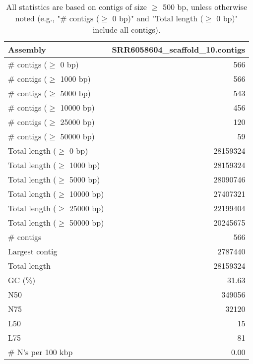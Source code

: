 \documentclass[12pt,a4paper]{article}
\begin{document}
\begin{table}[ht]
\begin{center}
\caption{All statistics are based on contigs of size $\geq$ 500 bp, unless otherwise noted (e.g., "\# contigs ($\geq$ 0 bp)" and "Total length ($\geq$ 0 bp)" include all contigs).}
\begin{tabular}{|l*{1}{|r}|}
\hline
Assembly & SRR6058604\_scaffold\_10.contigs \\ \hline
\# contigs ($\geq$ 0 bp) & 566 \\ \hline
\# contigs ($\geq$ 1000 bp) & 566 \\ \hline
\# contigs ($\geq$ 5000 bp) & 543 \\ \hline
\# contigs ($\geq$ 10000 bp) & 456 \\ \hline
\# contigs ($\geq$ 25000 bp) & 120 \\ \hline
\# contigs ($\geq$ 50000 bp) & 59 \\ \hline
Total length ($\geq$ 0 bp) & 28159324 \\ \hline
Total length ($\geq$ 1000 bp) & 28159324 \\ \hline
Total length ($\geq$ 5000 bp) & 28090746 \\ \hline
Total length ($\geq$ 10000 bp) & 27407321 \\ \hline
Total length ($\geq$ 25000 bp) & 22199404 \\ \hline
Total length ($\geq$ 50000 bp) & 20245675 \\ \hline
\# contigs & 566 \\ \hline
Largest contig & 2787440 \\ \hline
Total length & 28159324 \\ \hline
GC (\%) & 31.63 \\ \hline
N50 & 349056 \\ \hline
N75 & 32120 \\ \hline
L50 & 15 \\ \hline
L75 & 81 \\ \hline
\# N's per 100 kbp & 0.00 \\ \hline
\end{tabular}
\end{center}
\end{table}
\end{document}
